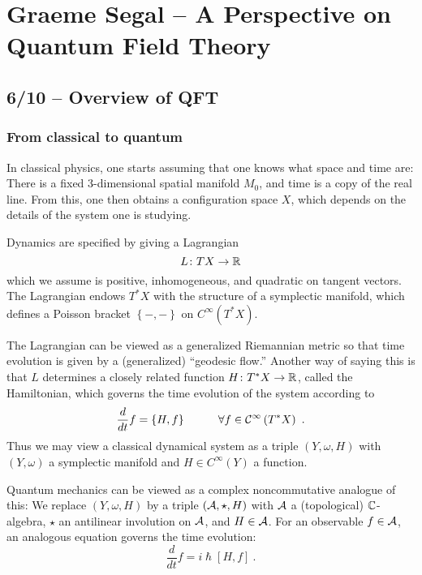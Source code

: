 \chapter{Graeme Segal -- A Perspective on Quantum Field Theory}

\section{6/10 -- Overview of QFT}

\subsection{From classical to quantum}

In classical physics, one starts assuming that one knows what space and time are:
There is a fixed $3$-dimensional spatial manifold $M_0$, and time is a copy of the real
line. 
From this, one then obtains a configuration space $X$, which depends on the details of the
system one is studying.

Dynamics are specified by giving a Lagrangian
\begin{equation*}
L \colon TX \to \mathbb{R}
\end{equation*}
which we assume is positive, inhomogeneous, and quadratic on tangent vectors.
The Lagrangian endows $T^*X$ with the structure of a symplectic manifold, which defines
a Poisson bracket $\left\{-,-\right\}$ on $C^\infty\left(T^* X\right)$. 

The Lagrangian can be viewed as a generalized Riemannian metric so that 
time evolution is given by a (generalized) ``geodesic flow.''
Another way of saying this is that $L$ 
determines a closely related function $H\colon T^*X \to \mathbb{R}$, called the Hamiltonian, which
governs the time evolution of the system according to
\begin{equation*}
\frac{d}{dt} f = \{ H, f \} \hspace{3em} \forall f \in \mathcal{C}^\infty \left(T^* X\right) \ .
\end{equation*}
Thus we may view a classical dynamical system as a triple $(Y, \omega, H)$ with $(Y,
\omega)$ a symplectic manifold and $H\in C^\infty\left(Y\right)$ a function.

Quantum mechanics can be viewed as a complex noncommutative analogue of this:
We replace $(Y, \omega, H)$ by a triple $(\mathcal{A}, \star, H)$ with $\mathcal{A}$ a (topological)
$\mathbb{C}$-algebra, $\star$ an antilinear involution on $\mathcal{A}$, and $H \in \mathcal{A}$.
For an observable $f \in \mathcal{A}$, an analogous equation governs the time evolution:
\begin{equation*}
\frac{d}{dt} f = i \hslash \left[H , f\right] \ .
\end{equation*}

